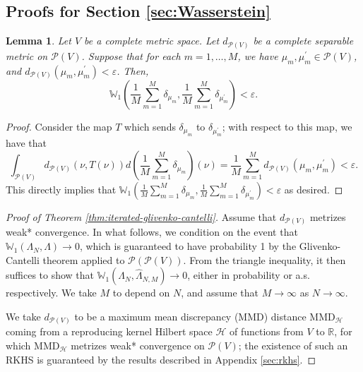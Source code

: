\documentclass[aos, preprint]{imsart}
\theoremstyle{plain}
\newtheorem{lem}[theorem]{Lemma}
\theoremstyle{remark}
\begin{document}
\begin{appendix}
\subsection{\texorpdfstring{Proofs for Section \ref{sec:Wasserstein}}{Proofs for Section 3}}
\label{subsec:proofs-for-Wasserstein}
\begin{lem}
\label{lem:doubly empirical random measure}Let $V$ be a complete
metric space. Let $d_{\mathcal{P}(V)}$ be a complete separable metric
on $\mathcal{P}(V)$. Suppose that for each $m=1,\ldots,M$, we have
$\mu_{m},\mu_{m}^{\prime}\in\mathcal{P}(V)$, and $d_{\mathcal{P}(V)}(\mu_{m},\mu_{m}^{\prime})<\varepsilon$.
Then,
\[
\mathbb{W}_{1}\left(\frac{1}{M}\sum_{m=1}^{M}\delta_{\mu_{m}},\frac{1}{M}\sum_{m=1}^{M}\delta_{\mu_{m}^{\prime}}\right)<\varepsilon.
\]
\end{lem}

\begin{proof}
Consider the map $T$ which sends $\delta_{\mu_{m}}$ to $\delta_{\mu_{m}^{\prime}}$;
with respect to this map, we have that
\[
\int_{\mathcal{P}(V)}d_{\mathcal{P}(V)}(\nu,T(\nu))d\left(\frac{1}{M}\sum_{m=1}^{M}\delta_{\mu_{m}}\right)(\nu)=\frac{1}{M}\sum_{m=1}^{M}d_{\mathcal{P}(V)}(\mu_{m},\mu_{m}^{\prime})<\varepsilon.
\]
This directly implies that $\mathbb{W}_{1}\left(\frac{1}{M}\sum_{m=1}^{M}\delta_{\mu_{m}},\frac{1}{M}\sum_{m=1}^{M}\delta_{\mu_{m}^{\prime}}\right)<\varepsilon$
as desired.
\end{proof}

\begin{proof}[Proof of Theorem \ref{thm:iterated-glivenko-cantelli}]
Assume that $d_{\mathcal{P}(V)}$ metrizes weak{*} convergence. In
what follows, we condition on the event that $\mathbb{W}_{1}(\Lambda_{N},\Lambda)\rightarrow0$,
which is guaranteed to have probability 1 by the Glivenko-Cantelli theorem applied to $\mathcal{P}(\mathcal{P}(V))$.
From the triangle inequality, it then suffices to show that $\mathbb{W}_{1}(\Lambda_{N},\hat{\Lambda}_{N,M})\rightarrow0$, either in probability or a.s. respectively. We take $M$ to depend on $N$, and assume that
$M\rightarrow\infty$ as $N\rightarrow\infty$.

We take $d_{\mathcal{P}(V)}$ to be a maximum mean discrepancy (MMD)
distance $\text{MMD}_{\mathcal{H}}$ coming from a reproducing kernel
Hilbert space $\mathcal{H}$ of functions from $V$ to $\mathbb{R}$,
for which $\text{MMD}_{\mathcal{H}}$ metrizes weak{*} convergence
on $\mathcal{P}(V)$; the existence of such an RKHS is guaranteed
by the results described in Appendix \ref{sec:rkhs}.


\end{proof}
\end{appendix}
\end{document}
